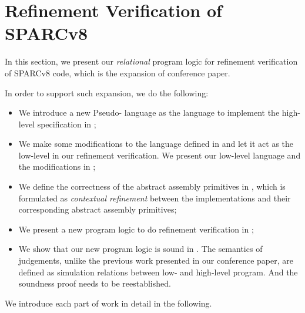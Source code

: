 \section{Refinement Verification of SPARCv8}
\label{sec:refine-verification-sparc}

In this section, we present our \textit{relational} 
program logic for refinement verification of 
SPARCv8 code, which is the expansion of conference paper. 
{\color{blue}
In order to support such expansion, we do the following:
\begin{itemize}
    \item We introduce a new Pseudo-\sparc{} language 
        as the language to implement the high-level 
        specification in 
        \Sec{\ref{subsec:High-level Pseudo-SPARCv8 Language}}; 
    \item We make some modifications to the \sparc{} 
        language defined in \Sec{\ref{sec:modeling}} and 
        let it act as the low-level in our refinement 
        verification. We present our low-level \sparc{} 
        language and the modifications in 
        \Sec{\ref{subsec:low-level SPARCv8 Program}};
    \item We define the correctness of the abstract 
        assembly primitives in 
        \Sec{\ref{subsec:correctness-primitive}}, 
        which is formulated as \textit{contextual refinement}
        between the implementations and their 
        corresponding abstract assembly primitives; 
    \item We present a new program logic to do 
        refinement verification in 
        \Sec{\ref{subsec:rellogic}}; 
    \item We show that our new program logic is 
        sound in \Sec{\ref{subsec:semantics and soundness}}.
        The semantics of judgements,
        unlike the previous work presented in our 
        conference paper, are defined as 
        simulation relations between low- and high-level 
        program. And the soundness proof needs to 
        be reestablished. 
\end{itemize}
We introduce each part of work in detail in the following.
} 

